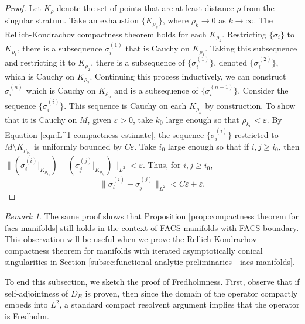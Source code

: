 \documentclass[12pt, reqno]{amsart}
\theoremstyle{plain} %
\theoremstyle{definition}
\theoremstyle{remark}
\newtheorem{remark}[theorem]{Remark}
\numberwithin{equation}{section}
\newcommand{\norm}[1]{\lVert #1 \rVert}
\newcommand{\field}[1]{\mathbb{#1}}
\newcommand{\R}{\field{R}}
\newcommand{\hdim}{h} %
\begin{document}
\begin{proof}
    Let \(K_\rho\) denote the set of points that are at least distance \(\rho\) from the singular stratum.
    Take an exhaustion \(\{K_{\rho_k}\}\), where \(\rho_k \to 0\) as \(k \to \infty\).
    The Rellich-Kondrachov compactness theorem holds for each \(K_{\rho_k}\).
    Restricting \(\{\sigma_i\}\) to \(K_{\rho_1}\), there is a subsequence \(\sigma_i^{(1)}\) that is Cauchy on \(K_{\rho_1}\).
    Taking this subsequence and restricting it to \(K_{\rho_2}\), there is a subsequence of \(\{\sigma_i^{(1)}\}\), denoted \(\{\sigma_i^{(2)}\}\), which is Cauchy on \(K_{\rho_2}\).
    Continuing this process inductively, we can construct \(\sigma_i^{(n)}\) which is Cauchy on \(K_{\rho_n}\) and is a subsequence of \(\{\sigma_i^{(n-1)}\}\).
    Consider the sequence \(\{\sigma_i^{(i)}\}\).
    This sequence is Cauchy on each \(K_{\rho_n}\) by construction.
    To show that it is Cauchy on \(M\), given \(\varepsilon > 0\), take \(k_0\) large enough so that \(\rho_{k_0} < \varepsilon\).
    By Equation \eqref{eqn:L^1 compactness estimate}, the sequence \(\{\sigma_i^{(i)}\}\) restricted to \(M \setminus K_{\rho_{k_0}}\) is uniformly bounded by \(C \varepsilon\).
    Take \(i_0\) large enough so that if \(i,j \geq i_0\), then \(\norm{(\sigma_i^{(i)}|_{ K_{\rho_{k_0}} }) - (\sigma_j^{(j)}|_{ K_{\rho_{k_0}} })}_{L^2} < \varepsilon\).
    Thus, for \(i,j \geq i_0\),
    \begin{equation*}
        \norm{ \sigma_i^{(i)} - \sigma_j^{(j)} }_{L^2} < C \varepsilon + \varepsilon.
    \end{equation*}
\end{proof}
\begin{remark}\label{rem:compactness theorem for C_1-manifolds with C_1-boundary}
    The same proof shows that Proposition \ref{prop:compactness theorem for facs manifolds} still holds in the context of FACS manifolds with FACS boundary.
    This observation will be useful when we prove the Rellich-Kondrachov compactness theorem for manifolds with iterated asymptotically conical singularities in Section \ref{subsec:functional analytic preliminaries - iacs manifolds}.
\end{remark}

To end this subsection, we sketch the proof of Fredholmness.
First, observe that if self-adjointness of \(D_B\) is proven, then since the domain of the operator compactly embeds into \(L^2\), a standard compact resolvent argument implies that the operator is Fredholm.
\end{document}
